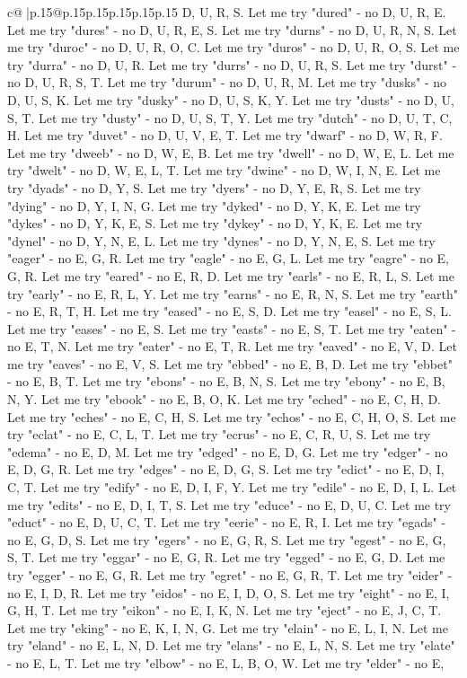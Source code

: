 \documentclass{article}
\begin{document}
{\begin{supertabular}{c@{$\;$}|p{.15\linewidth}@{}p{.15\linewidth}p{.15\linewidth}p{.15\linewidth}p{.15\linewidth}p{.15\linewidth}}
{{{D, U, R, S. Let me try "dured" {-} no D, U, R, E. Let me try "dures" {-} no D, U, R, E, S. Let me try "durns" {-} no D, U, R, N, S. Let me try "duroc" {-} no D, U, R, O, C. Let me try "duros" {-} no D, U, R, O, S. Let me try "durra" {-} no D, U, R. Let me try "durrs" {-} no D, U, R, S. Let me try "durst" {-} no D, U, R, S, T. Let me try "durum" {-} no D, U, R, M. Let me try "dusks" {-} no D, U, S, K. Let me try "dusky" {-} no D, U, S, K, Y. Let me try "dusts" {-} no D, U, S, T. Let me try "dusty" {-} no D, U, S, T, Y. Let me try "dutch" {-} no D, U, T, C, H. Let me try "duvet" {-} no D, U, V, E, T. Let me try "dwarf" {-} no D, W, R, F. Let me try "dweeb" {-} no D, W, E, B. Let me try "dwell" {-} no D, W, E, L. Let me try "dwelt" {-} no D, W, E, L, T. Let me try "dwine" {-} no D, W, I, N, E. Let me try "dyads" {-} no D, Y, S. Let me try "dyers" {-} no D, Y, E, R, S. Let me try "dying" {-} no D, Y, I, N, G. Let me try "dyked" {-} no D, Y, K, E. Let me try "dykes" {-} no D, Y, K, E, S. Let me try "dykey" {-} no D, Y, K, E. Let me try "dynel" {-} no D, Y, N, E, L. Let me try "dynes" {-} no D, Y, N, E, S. Let me try "eager" {-} no E, G, R. Let me try "eagle" {-} no E, G, L. Let me try "eagre" {-} no E, G, R. Let me try "eared" {-} no E, R, D. Let me try "earls" {-} no E, R, L, S. Let me try "early" {-} no E, R, L, Y. Let me try "earns" {-} no E, R, N, S. Let me try "earth" {-} no E, R, T, H. Let me try "eased" {-} no E, S, D. Let me try "easel" {-} no E, S, L. Let me try "eases" {-} no E, S. Let me try "easts" {-} no E, S, T. Let me try "eaten" {-} no E, T, N. Let me try "eater" {-} no E, T, R. Let me try "eaved" {-} no E, V, D. Let me try "eaves" {-} no E, V, S. Let me try "ebbed" {-} no E, B, D. Let me try "ebbet" {-} no E, B, T. Let me try "ebons" {-} no E, B, N, S. Let me try "ebony" {-} no E, B, N, Y. Let me try "ebook" {-} no E, B, O, K. Let me try "eched" {-} no E, C, H, D. Let me try "eches" {-} no E, C, H, S. Let me try "echos" {-} no E, C, H, O, S. Let me try "eclat" {-} no E, C, L, T. Let me try "ecrus" {-} no E, C, R, U, S. Let me try "edema" {-} no E, D, M. Let me try "edged" {-} no E, D, G. Let me try "edger" {-} no E, D, G, R. Let me try "edges" {-} no E, D, G, S. Let me try "edict" {-} no E, D, I, C, T. Let me try "edify" {-} no E, D, I, F, Y. Let me try "edile" {-} no E, D, I, L. Let me try "edits" {-} no E, D, I, T, S. Let me try "educe" {-} no E, D, U, C. Let me try "educt" {-} no E, D, U, C, T. Let me try "eerie" {-} no E, R, I. Let me try "egads" {-} no E, G, D, S. Let me try "egers" {-} no E, G, R, S. Let me try "egest" {-} no E, G, S, T. Let me try "eggar" {-} no E, G, R. Let me try "egged" {-} no E, G, D. Let me try "egger" {-} no E, G, R. Let me try "egret" {-} no E, G, R, T. Let me try "eider" {-} no E, I, D, R. Let me try "eidos" {-} no E, I, D, O, S. Let me try "eight" {-} no E, I, G, H, T. Let me try "eikon" {-} no E, I, K, N. Let me try "eject" {-} no E, J, C, T. Let me try "eking" {-} no E, K, I, N, G. Let me try "elain" {-} no E, L, I, N. Let me try "eland" {-} no E, L, N, D. Let me try "elans" {-} no E, L, N, S. Let me try "elate" {-} no E, L, T. Let me try "elbow" {-} no E, L, B, O, W. Let me try "elder" {-} no E, }}}
\end{supertabular}}
\end{document}
